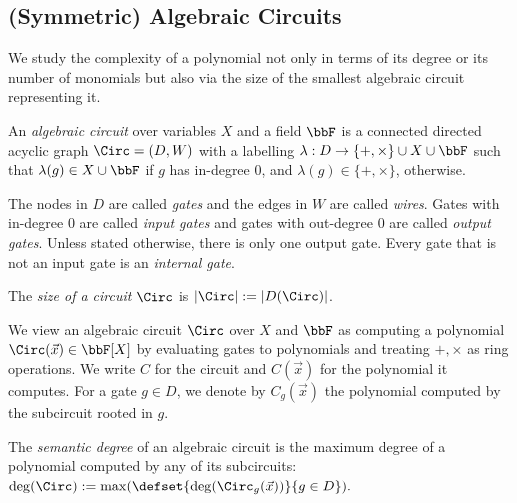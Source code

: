 \documentclass[a4paper,UKenglish,cleveref, autoref, thm-restate]{lipics-v2021}
\begin{document}
	
	\subsection{(Symmetric) Algebraic Circuits}
	\label{sec:circuits}
	We study the complexity of a polynomial not only in terms of its degree or its number of monomials but also via the size of the smallest algebraic circuit representing it. 
	\begin{definition}
		An \textit{algebraic circuit} over variables $X$ and a field $\bbF$ is
		a connected directed acyclic graph $\Circ = (D,W)$ with a labelling
		$\lambda: D \rightarrow \{+,\times \} \cup X \cup \bbF$ 
		such that $\lambda(g) \in X \cup \bbF$ if $g$ has in-degree $0$, and $\lambda(g) \in \{+,\times\}$, otherwise.
	\end{definition}
	The nodes in $D$ are called \textit{gates} and the edges in $W$ are called \textit{wires}.
	Gates with in-degree $0$ are called \textit{input gates} and gates with out-degree $0$
	are called \textit{output gates}. Unless stated otherwise,
	there is only one output gate.
	Every gate that is not an input gate is an \textit{internal gate}.

	The \textit{size of a circuit} $\Circ$ is
	$|\Circ| := |D(\Circ)|$.
	

	
	We view an algebraic circuit $\Circ$ over $X$ and $\bbF$ as computing
	a polynomial $\Circ(\vec x) \in \bbF[X]$ by evaluating gates to polynomials and treating
	$+, \times$ as ring operations. We write $C$ for the circuit and $C(\vec x)$ for the polynomial it computes. For a gate $g \in D$, we denote by $C_g(\vec x)$ the polynomial computed by the subcircuit rooted in $g$.
	
	
	The \textit{semantic degree} of an algebraic circuit is the maximum degree of a polynomial computed by any of its subcircuits:
	$\deg (\Circ) := \max(\defset{\deg(\Circ_g(\vec x))}{g \in D}).$
	
\end{document}
